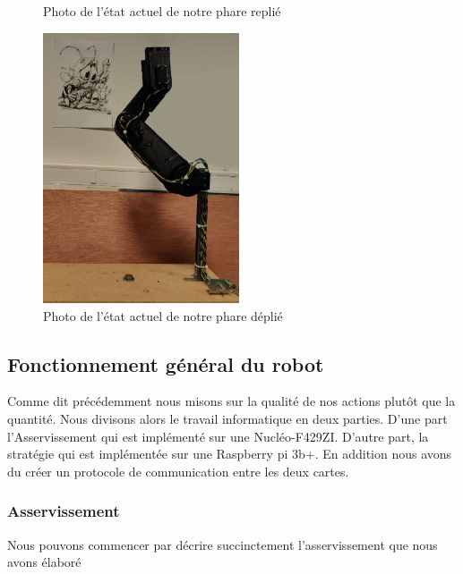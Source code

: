 \documentclass[a4paper,10pt]{article}
\begin{document}
\begin{spacing}{1.5}
\begin{multicols}{2}
\begin{figure}[H]
  \caption{Photo de l'état actuel de notre phare replié}
\end{figure}
\columnbreak
\begin{figure}[H]
  \center
  \includegraphics[scale=0.3, height=8cm]{phare_d.png}
  \caption{Photo de l'état actuel de notre phare déplié}
\end{figure}
\end{multicols}
\subsection{Fonctionnement général du robot}
Comme dit précédemment nous misons sur la qualité de nos actions plutôt que la
quantité. Nous divisons alors le travail informatique en deux parties. D'une
part l'Asservissement qui est implémenté sur une Nucléo-F429ZI. D'autre part, la
stratégie qui est implémentée sur une Raspberry pi 3b+. En addition nous avons du
créer un protocole de communication entre les deux cartes.\\

\subsubsection{Asservissement}
Nous pouvons commencer par décrire succinctement l'asservissement que nous avons
élaboré \\ %


\end{spacing}
\end{document}
